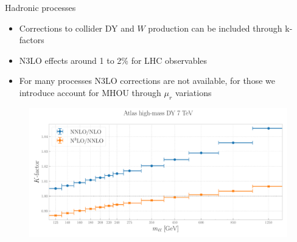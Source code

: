 \documentclass[8pt,t]{beamer}
\begin{document}
\begin{frame}{Hadronic processes}
  \begin{itemize}
    \item Corrections to collider DY and $W$ production can be included through k-factors
    \item N3LO effects around 1 to 2\% for LHC observables
    \item For many processes N3LO corrections are not available, for those we introduce account for MHOU through $\mu_r$ variations
  \end{itemize}
  \begin{figure}[!t]
    \centering
    \includegraphics[width=.80\textwidth]{figures/kfactor_ATLASZHIGHMASS49FB.pdf}
  \end{figure}
\end{frame}
\end{document}
